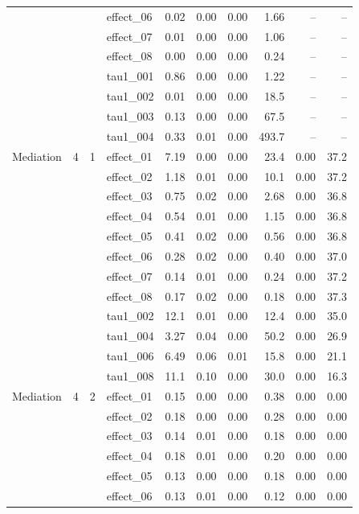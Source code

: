{\begin{longtable}{lccl rr r r rr}
 &  &  & effect\_06 & 0.02 & 0.00 & 0.00 & 1.66 & -- & --\\
 &  &  & effect\_07 & 0.01 & 0.00 & 0.00 & 1.06 & -- & --\\
 &  &  & effect\_08 & 0.00 & 0.00 & 0.00 & 0.24 & -- & --\\
 &  &  & tau1\_001 & 0.86 & 0.00 & 0.00 & 1.22 & -- & --\\
 &  &  & tau1\_002 & 0.01 & 0.00 & 0.00 & 18.5 & -- & --\\
 &  &  & tau1\_003 & 0.13 & 0.00 & 0.00 & 67.5 & -- & --\\
 &  &  & tau1\_004 & 0.33 & 0.01 & 0.00 & 493.7 & -- & --\\
\midrule
Mediation & 4 & 1 & effect\_01 & 7.19 & 0.00 & 0.00 & 23.4 & 0.00 & 37.2\\
 &  &  & effect\_02 & 1.18 & 0.01 & 0.00 & 10.1 & 0.00 & 37.2\\
 &  &  & effect\_03 & 0.75 & 0.02 & 0.00 & 2.68 & 0.00 & 36.8\\
 &  &  & effect\_04 & 0.54 & 0.01 & 0.00 & 1.15 & 0.00 & 36.8\\
 &  &  & effect\_05 & 0.41 & 0.02 & 0.00 & 0.56 & 0.00 & 36.8\\
 &  &  & effect\_06 & 0.28 & 0.02 & 0.00 & 0.40 & 0.00 & 37.0\\
 &  &  & effect\_07 & 0.14 & 0.01 & 0.00 & 0.24 & 0.00 & 37.2\\
 &  &  & effect\_08 & 0.17 & 0.02 & 0.00 & 0.18 & 0.00 & 37.3\\
 &  &  & tau1\_002 & 12.1 & 0.01 & 0.00 & 12.4 & 0.00 & 35.0\\
 &  &  & tau1\_004 & 3.27 & 0.04 & 0.00 & 50.2 & 0.00 & 26.9\\
 &  &  & tau1\_006 & 6.49 & 0.06 & 0.01 & 15.8 & 0.00 & 21.1\\
 &  &  & tau1\_008 & 11.1 & 0.10 & 0.00 & 30.0 & 0.00 & 16.3\\
\midrule
Mediation & 4 & 2 & effect\_01 & 0.15 & 0.00 & 0.00 & 0.38 & 0.00 & 0.00\\
 &  &  & effect\_02 & 0.18 & 0.00 & 0.00 & 0.28 & 0.00 & 0.00\\
 &  &  & effect\_03 & 0.14 & 0.01 & 0.00 & 0.18 & 0.00 & 0.00\\
 &  &  & effect\_04 & 0.18 & 0.01 & 0.00 & 0.20 & 0.00 & 0.00\\
 &  &  & effect\_05 & 0.13 & 0.00 & 0.00 & 0.18 & 0.00 & 0.00\\
 &  &  & effect\_06 & 0.13 & 0.01 & 0.00 & 0.12 & 0.00 & 0.00\\

\end{longtable}}

